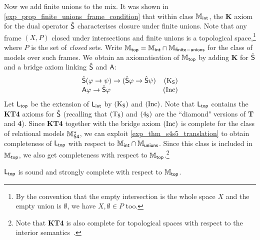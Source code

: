 Now we add finite unions to the mix. It was shown in
\cref{exp_prop_finite_unions_frame_condition} that within class $\Mint$, the
\textbf{K} axiom for the dual operator $\hat\S$ characterises closure under
finite unions. Note that any frame $(X, P)$ closed under intersections and
finite unions is a topological space,\footnote{By the convention that the empty
intersection is the whole space $X$ and the empty union is $\emptyset$, we have
$X, \emptyset \in P$ too.} where $P$ is the set of \emph{closed} sets. Write
$\Mtop = \Mint \cap \Mfunions$ for the class of models over such frames. We
obtain an axiomatisation of $\Mtop$ by adding \textbf{K} for $\hat\S$ and a
bridge axiom linking $\hat\S$ and $\A$:
\[
    \begin{array}{lr}
        \hat{\S}(\phi \limplies \psi) \limplies (\hat{\S}\phi \limplies \hat{\S}\psi)
            & \Ksoundness \\
        \A\phi \limplies \hat\S\phi
    & \inc
    \end{array}
\]
Let $\sLtop$ be the extension
of $\sLint$ by $\Ksoundness$ and $\inc$. Note that $\sLtop$ contains the
\textbf{KT4} axioms for $\hat\S$ (recalling that $\Tsoundness$ and
$\foursoundness$ are the ``diamond" versions of \textbf{T} and \textbf{4}).
Since \textbf{KT4} together with the bridge axiom $\inc$ is complete for the
class of relational models $\Msfour$, we can exploit
\cref{exp_thm_s4s5_translation} to obtain completeness of $\sLtop$ with respect to
$\Mint \cap \Munions$. Since this class is included in $\Mtop$, we also get
completeness with respect to $\Mtop$.\footnote{Note that \textbf{KT4} is also
complete for topological spaces with respect to the interior
semantics~\cite{van2007modal}.}

\begin{theorem}
\label{exp_thm_mtop_axiomatisation}
    $\sLtop$ is sound and strongly complete with respect to $\Mtop$.
\end{theorem}

